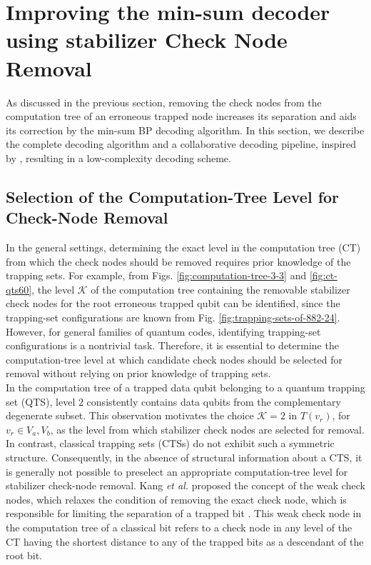 \documentclass[%
 reprint,
 amsmath,amssymb,
 aps,
pra,
showkeys,
]{revtex4-2}
\begin{document}
\section{Improving the min-sum decoder using stabilizer Check Node Removal}
\label{sec:collab-decoding}
As discussed in the previous section, removing the check nodes from the computation tree of an erroneous trapped node increases its separation and aids its correction by the min-sum BP decoding algorithm.
In this section, we describe the complete decoding algorithm and a collaborative decoding pipeline, inspired by \cite{kang2015breaking}, resulting in a low-complexity decoding scheme.
\subsection{Selection of the Computation-Tree Level for Check-Node Removal}
In the general settings, determining the exact level in the computation tree (CT) from which the check nodes should be removed requires prior knowledge of the trapping sets.
For example, from Figs. \ref{fig:computation-tree-3-3} and \ref{fig:ct-qts60}, the level $\mathcal{K}$ of the computation tree containing the removable stabilizer check nodes for the root erroneous trapped qubit can be identified, since the trapping-set configurations are known from Fig. \ref{fig:trapping-sets-of-882-24}.
However, for general families of quantum codes, identifying trapping-set configurations is a nontrivial task. 
Therefore, it is essential to determine the computation-tree level at which candidate check nodes should be selected for removal without relying on prior knowledge of trapping sets.\\
In the computation tree of a trapped data qubit belonging to a quantum trapping set (QTS), level $2$ consistently contains data qubits from the complementary degenerate subset. This observation motivates the choice $\mathcal{K} = 2$ in $T(v_r)$, for $v_r \in V_a, V_b$, as the level from which stabilizer check nodes are selected for removal. 
In contrast, classical trapping sets (CTSs) do not exhibit such a symmetric structure. Consequently, in the absence of structural information about a CTS, it is generally not possible to preselect an appropriate computation-tree level for stabilizer check-node removal.
Kang \emph{et al.} proposed the concept of the weak check nodes, which relaxes the condition of removing the exact check node, which is responsible for limiting the separation of a trapped bit \cite{kang2015breaking}.
This weak check node in the computation tree of a classical bit refers to a check node in any level of the CT having the shortest distance to any of the trapped bits as a descendant of the root bit.
\end{document}
